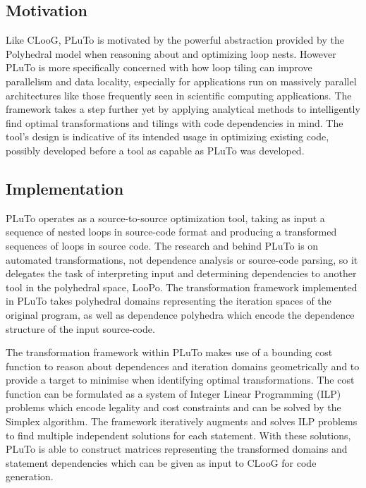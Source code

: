 \documentclass[a4paper,12pt,twoside]{report}
\begin{document}
\subsection*{Motivation}
Like CLooG, PLuTo is motivated by the powerful abstraction provided by the Polyhedral model when reasoning about and optimizing loop
nests. However PLuTo is more specifically concerned with how loop tiling can improve parallelism and data locality, especially
for applications run on massively parallel architectures like those frequently seen in scientific computing applications. The framework
takes a step further yet by applying analytical methods to intelligently find optimal transformations and tilings with code dependencies in mind.
The tool's design is indicative of its intended usage in optimizing existing code, possibly developed before a tool as capable as PLuTo was developed.

\subsection*{Implementation}
PLuTo operates as a source-to-source optimization tool, taking as input a sequence of nested loops in source-code format
and producing a transformed sequences of loops in source code. The research and behind PLuTo is on automated transformations,
not dependence analysis or source-code parsing, so it delegates the task of interpreting input and determining dependencies
to another tool in the polyhedral space, LooPo. The transformation framework implemented in PLuTo takes polyhedral domains representing the iteration
spaces of the original program, as well as dependence polyhedra which encode the dependence structure of the input source-code.

The transformation framework within PLuTo makes use of a bounding cost function to reason about dependences and iteration domains
geometrically and to provide a target to minimise when identifying optimal transformations. The cost function can be formulated
as a system of Integer Linear Programming (ILP) problems which encode legality and cost constraints and can be solved by the Simplex
algorithm. The framework iteratively augments and solves ILP problems to find multiple independent solutions for each statement. With
these solutions, PLuTo is able to construct matrices representing the transformed domains and statement dependencies which can be
given as input to CLooG for code generation.
\end{document}
